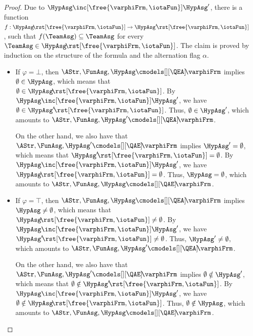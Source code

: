 \documentclass[authoryear]{elsarticle}
\newcommand{\EmpTeamAsg}{\emptyset}
\newcommand{\EmpHypAsg}{\emptyset}
\begin{document}
\begin{proof}
%
  Due to $\HypAsg \inc[\free{\varphiFrm,\iotaFun}] \HypAsg'$, there is a
  function $f : \HypAsg \!\rst[\free{\varphiFrm,\iotaFun}] \rightarrow \HypAsg'
  \!\rst[\free{\varphiFrm,\iotaFun}]$, such that $f(\TeamAsg) \subseteq
  \TeamAsg$ for every $\TeamAsg\in\HypAsg \!\rst[\free{\varphiFrm,\iotaFun}]$.
  The claim is proved by induction on the structure of the formula and the
  alternation flag $\alpha$.
  \begin{itemize}
  \item If $\varphi = \bot$, then $\AStr, \FunAsg, \HypAsg
    \cmodels[][\QEA]\! \varphiFrm$ implies $\EmpTeamAsg \in \HypAsg$, which
    means that $\EmpTeamAsg \in \HypAsg \!\rst[\free{\varphiFrm,\iotaFun}]$.
    By $\HypAsg \inc[\free{\varphiFrm,\iotaFun}] \HypAsg'$, we have $\EmpTeamAsg
    \in \HypAsg' \!\rst[\free{\varphiFrm,\iotaFun}]$.
    Thus, $\EmpTeamAsg \in \HypAsg'$, which amounts to $\AStr, \FunAsg, \HypAsg'
    \cmodels[][\QEA]\! \varphiFrm$.

    On the other hand, we also have that $\AStr, \FunAsg, \HypAsg'
    \cmodels[][\QAE]\!
    \varphiFrm$ implies $\HypAsg' = \EmpHypAsg$, which means that $\HypAsg'
    \!\rst[\free{\varphiFrm,\iotaFun}] = \EmpHypAsg$.
    By $\HypAsg \inc[\free{\varphiFrm,\iotaFun}] \HypAsg'$, we have $\HypAsg
    \!\rst[\free{\varphiFrm,\iotaFun}] = \EmpHypAsg$.
    Thus, $\HypAsg = \EmpHypAsg$, which amounts to $\AStr, \FunAsg, \HypAsg
    \cmodels[][\QAE]\! \varphiFrm$.

  \item If $\varphi = \top$, then $\AStr, \FunAsg, \HypAsg
    \cmodels[][\QEA]\! \varphiFrm$ implies $\HypAsg \neq \EmpHypAsg$, which
    means that $\HypAsg \!\rst[\free{\varphiFrm,\iotaFun}] \neq \EmpHypAsg$.
    By $\HypAsg \inc[\free{\varphiFrm,\iotaFun}] \HypAsg'$, we have $\HypAsg'
    \!\rst[\free{\varphiFrm,\iotaFun}] \neq \EmpHypAsg$.
    Thus, $\HypAsg' \neq \EmpHypAsg$, which amounts to $\AStr, \FunAsg, \HypAsg'
    \cmodels[][\QEA]\! \varphiFrm$.

    On the other hand, we also have that $\AStr, \FunAsg, \HypAsg'
    \cmodels[][\QAE]\!
    \varphiFrm$ implies $\EmpTeamAsg \notin \HypAsg'$, which means that
    $\EmpTeamAsg \notin \HypAsg' \!\rst[\free{\varphiFrm,\iotaFun}]$.
    By $\HypAsg \inc[\free{\varphiFrm,\iotaFun}] \HypAsg'$, we have $\EmpTeamAsg \notin
    \HypAsg \!\rst[\free{\varphiFrm,\iotaFun}]$.
    Thus, $\EmpTeamAsg \notin \HypAsg$, which amounts to $\AStr, \FunAsg,
    \HypAsg \cmodels[][\QAE]\! \varphiFrm$.


\end{itemize}
\end{proof}
\end{document}
